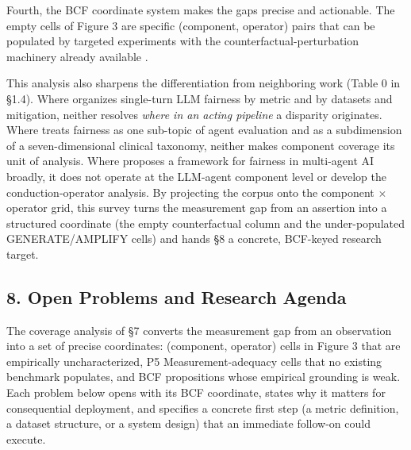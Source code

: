 \documentclass[10pt]{article}
\begin{document}
Fourth, the BCF coordinate system makes the gaps precise and actionable. The empty cells of Figure 3 are specific (component, operator) pairs that can be populated by targeted experiments with the counterfactual-perturbation machinery already available \cite{parziale2025systematic,mayilvaghanan2026counterfactual,basu2026names}.

This analysis also sharpens the differentiation from neighboring work (Table 0 in \S{}1.4). Where \cite{chu2024fairness} organizes single-turn LLM fairness by metric and \cite{gallegos2024bias} by datasets and mitigation, neither resolves \emph{where in an acting pipeline} a disparity originates. Where \cite{mohammadi2025evaluation} treats fairness as one sub-topic of agent evaluation and \cite{vatsal2026agentic} as a subdimension of a seven-dimensional clinical taxonomy, neither makes component coverage its unit of analysis. Where \cite{ranjan2025fairness} proposes a framework for fairness in multi-agent AI broadly, it does not operate at the LLM-agent component level or develop the conduction-operator analysis. By projecting the corpus onto the component $\times$ operator grid, this survey turns the measurement gap from an assertion into a structured coordinate (the empty counterfactual column and the under-populated GENERATE/AMPLIFY cells) and hands \S{}8 a concrete, BCF-keyed research target.


\subsection*{8. Open Problems and Research Agenda}

The coverage analysis of \S{}7 converts the measurement gap from an observation into a set of precise coordinates: (component, operator) cells in Figure 3 that are empirically uncharacterized, P5 Measurement-adequacy cells that no existing benchmark populates, and BCF propositions whose empirical grounding is weak. Each problem below opens with its BCF coordinate, states why it matters for consequential deployment, and specifies a concrete first step (a metric definition, a dataset structure, or a system design) that an immediate follow-on could execute.
\end{document}
